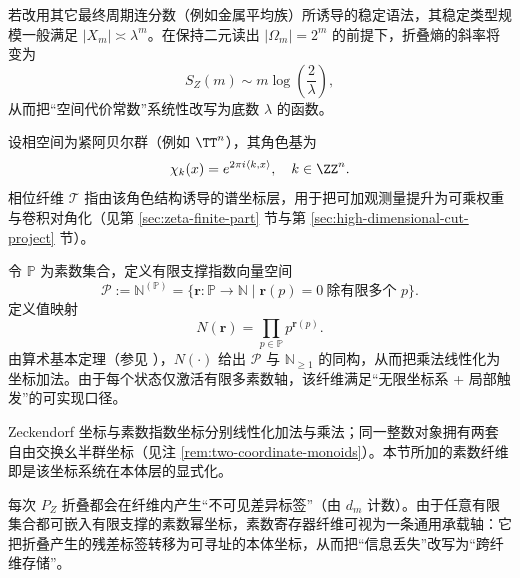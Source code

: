 \begin{remark}[更换尺度的代价斜率]\label{rem:pom-scale-slope}
若改用其它最终周期连分数（例如金属平均族）所诱导的稳定语法，其稳定类型规模一般满足 $|X_m|\asymp \lambda^m$。在保持二元读出 $|\Omega_m|=2^m$ 的前提下，折叠熵的斜率将变为
\[
S_Z(m)\sim m\log\!\left(\frac{2}{\lambda}\right),
\]
从而把“空间代价常数”系统性改写为底数 $\lambda$ 的函数。
\end{remark}

\begin{definition}\label{def:pom-phase-fiber}
设相空间为紧阿贝尔群（例如 $\TT^n$），其角色基为
\[
\chi_k(x)=e^{2\pi i\langle k,x\rangle},\quad k\in\ZZ^n.
\]
相位纤维 $\mathcal{T}$ 指由该角色结构诱导的谱坐标层，用于把可加观测量提升为可乘权重与卷积对角化（见第 \ref{sec:zeta-finite-part} 节与第 \ref{sec:high-dimensional-cut-project} 节）。
\end{definition}

\begin{definition}\label{def:pom-prime-fiber}
令 $\mathbb{P}$ 为素数集合，定义有限支撑指数向量空间
\[
\mathcal{P}:=\mathbb{N}^{(\mathbb{P})}=\{\mathbf{r}:\mathbb{P}\to\mathbb{N}\mid \mathbf{r}(p)=0\ \text{除有限多个 }p\}.
\]
定义值映射
\[
N(\mathbf{r})=\prod_{p\in\mathbb{P}} p^{\mathbf{r}(p)}.
\]
由算术基本定理（参见 \cite{Apostol1976}），$N(\cdot)$ 给出 $\mathcal{P}$ 与 $\mathbb{N}_{\ge 1}$ 的同构，从而把乘法线性化为坐标加法。由于每个状态仅激活有限多素数轴，该纤维满足“无限坐标系 + 局部触发”的可实现口径。
\end{definition}

\begin{remark}[两套自由交换幺半群坐标的并存]\label{rem:pom-two-monoids}
Zeckendorf 坐标与素数指数坐标分别线性化加法与乘法；同一整数对象拥有两套自由交换幺半群坐标（见注 \ref{rem:two-coordinate-monoids}）。本节所加的素数纤维即是该坐标系统在本体层的显式化。
\end{remark}

\begin{remark}[折叠残差的素数承载]\label{rem:pom-prime-carry}
每次 $P_Z$ 折叠都会在纤维内产生“不可见差异标签”（由 $d_m$ 计数）。由于任意有限集合都可嵌入有限支撑的素数幂坐标，素数寄存器纤维可视为一条通用承载轴：它把折叠产生的残差标签转移为可寻址的本体坐标，从而把“信息丢失”改写为“跨纤维存储”。
\end{remark}

